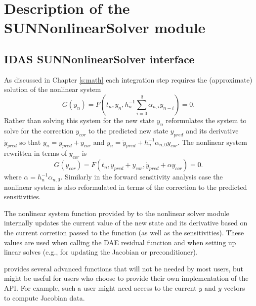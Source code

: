 \chapter{Description of the SUNNonlinearSolver module}\label{c:sunnonlinsol}


\section{IDAS SUNNonlinearSolver interface}
\label{s:sunnonlinsol_interface}

As discussed in Chapter \ref{s:math} each integration step requires the
(approximate) solution of the nonlinear system
\begin{equation}
  G(y_n) = F\left(t_n, y_n, h_{n}^{-1}\sum_{i=0}^{q}\alpha_{n,i}y_{n-i}\right) = 0.
\end{equation}
Rather than solving this system for the new state $y_n$ {\ida} reformulates the
system to solve for the correction $y_{cor}$ to the predicted new state $y_{pred}$
and its derivative $\dot{y}_{pred}$ so that $y_n = y_{pred} + y_{cor}$ and
$\dot{y}_n = \dot{y}_{pred} + h_{n}^{-1} \alpha_{n,0} y_{cor}$. The nonlinear
system rewritten in terms of $y_{cor}$ is
\begin{equation}
  G(y_{cor}) = F\left(t_n, y_{pred}+y_{cor},
  \dot{y}_{pred} + \alpha y_{cor}\right) = 0.
\end{equation}
where $\alpha = h_{n}^{-1} \alpha_{n,0}$.
Similarly in the forward sensitivity analysis case the nonlinear system is also
reformulated in terms of the correction to the predicted sensitivities.

The nonlinear system function provided by {\ida} to the nonlinear solver module
internally updates the current value of the new state and its derivative based
on the current corretion passed to the function (as well as the sensitivities).
These values are used when calling the DAE residual function and when setting up
linear solves (e.g., for updating the Jacobian or preconditioner).

{\idas} provides several advanced functions that will not be needed by most users,
but might be useful for users who choose to provide their own implementation of
the  API. For example, such a user might need access to
the current $y$ and $\dot{y}$ vectors to compute Jacobian data.

